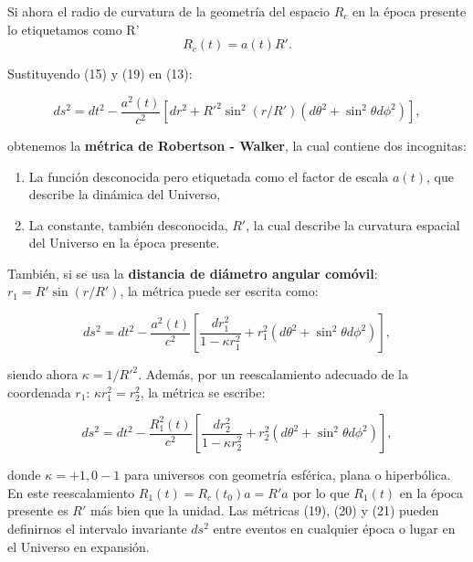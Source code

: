 \documentclass[11pt]{article}
\begin{document}
Si ahora el radio de curvatura de la geometría del espacio $R_c$ en la época presente lo etiquetamos como R'
    \begin{equation}
        R_c (t) = a(t) R'.
    \end{equation}

Sustituyendo (15) y (19) en (13):

    \begin{equation}
        ds^2 = dt^2 - \frac{a^2(t)}{c^2} [dr^2 + R'^2 \sin^2(r/R')(d \theta^2 + \sin^2 \theta d\phi^2)],
    \end{equation}

obtenemos la {\bf{métrica de Robertson - Walker}}, la cual contiene dos incognitas: 

    \begin{enumerate}
        \item La función desconocida pero etiquetada como el factor de escala $a(t)$, que describe la dinámica del Universo,
        \item La constante, también desconocida, $R'$, la cual describe la curvatura espacial del Universo en la época presente. 
    \end{enumerate} 

También, si se usa la {\bf{distancia de diámetro angular comóvil}}: $r_1 = R' \sin(r/R')$, la métrica puede ser escrita como:

    \begin{equation}
        ds^2 = dt^2 - \frac{a^2(t)}{c^2} \left[ \frac{dr_1^2}{1 - \kappa r_1^2} + r_1^2 (d\theta^2 + \sin^2 \theta d\phi^2) \right],
    \end{equation}

    siendo ahora $\kappa = 1/R'^2$. Además, por un reescalamiento adecuado de la coordenada $r_1$: $\kappa r_1^2=r_2^2$, la métrica se escribe:

    \begin{equation}
        ds^2 = dt^2 - \frac{R_1^2(t)}{c^2} \left[ \frac{dr_2^2}{1 - \kappa r_2^2} + r_2^2 (d\theta^2 + \sin^2 \theta d\phi^2) \right],
    \end{equation}

donde $\kappa = +1, 0 -1$ para universos con geometría esférica, plana o hiperbólica. En este reescalamiento $R_1(t)= R_c(t_0) a= R'a$ por lo que $R_1(t)$ en la época presente es $R'$ más bien que la unidad. 
Las métricas (19), (20) y (21) pueden definirnos el intervalo invariante $ds^2$ entre eventos en cualquier época o lugar en el Universo en expansión. 
\end{document}
